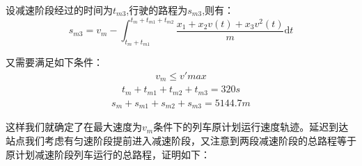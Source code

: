 \documentclass[12pt,a4paper]{nmmcm}
\begin{document}
设减速阶段经过的时间为$t_{m3}$,行驶的路程为$s_{m3}$,则有：
\begin{equation}
s_{m3}=v_m-\int_{t_m+t_{m1}}^{t_m+t_{m1}+t_{m2}}\frac{x_1+x_2v(t)+x_3v^2(t)}{m}\mathrm{d}t
\end{equation}

又需要满足如下条件：
\begin{eqnarray}
v_m\le v'{max}
\end{eqnarray}
\begin{eqnarray}
t_m+t_{m1}+t_{m2}+t_{m3}=320s
\end{eqnarray}
\begin{eqnarray}
s_m+s_{m1}+s_{m2}+s_{m3}=5144.7m
\end{eqnarray}

这样我们就确定了在最大速度为$v_m$条件下的列车原计划运行速度轨迹。延迟到达站点我们考虑有匀速阶段提前进入减速阶段，又注意到两段减速阶段的总路程等于原计划减速阶段列车运行的总路程，证明如下：
\end{document}
